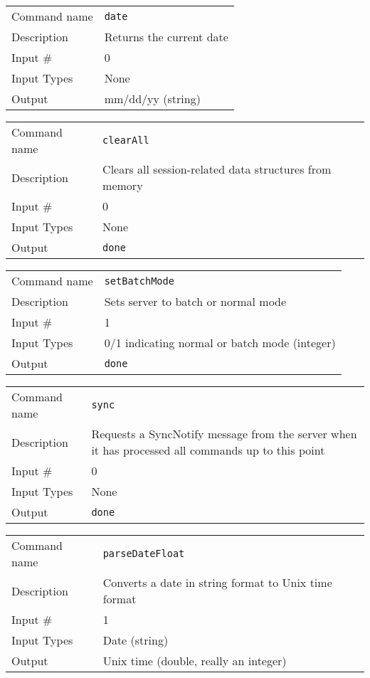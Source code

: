 \noindent
\begin{tabular}{l|p{5in}}
\hline
Command name & {\tt date} \\
Description  & Returns the current date \\
Input \#     & 0 \\
Input Types  & None \\
Output       & mm/dd/yy (string) \\
\hline
\end{tabular}

\bigskip

\noindent
\begin{tabular}{l|p{5in}}
\hline
Command name & {\tt clearAll} \\
Description  & Clears all session-related data structures from memory \\
Input \#     & 0 \\
Input Types  & None \\
Output       & {\tt done} \\
\hline
\end{tabular}

\bigskip

\noindent
\begin{tabular}{l|p{5in}}
\hline
Command name & {\tt setBatchMode} \\
Description  & Sets server to batch or normal mode \\
Input \#     & 1 \\
Input Types  & 0/1 indicating normal or batch mode (integer) \\
Output       & {\tt done} \\
\hline
\end{tabular}

\bigskip

\noindent
\begin{tabular}{l|p{5in}}
\hline
Command name & {\tt sync} \\
Description  & Requests a SyncNotify message from the server when it has
               processed all commands up to this point \\
Input \#     & 0 \\
Input Types  & None \\
Output       & {\tt done} \\
\hline
\end{tabular}

\bigskip

\noindent
\begin{tabular}{l|p{5in}}
\hline
Command name & {\tt parseDateFloat} \\
Description  & Converts a date in string format to Unix time format \\
Input \#     & 1 \\
Input Types  & Date (string) \\
Output       & Unix time (double, really an integer) \\
\hline
\end{tabular}


